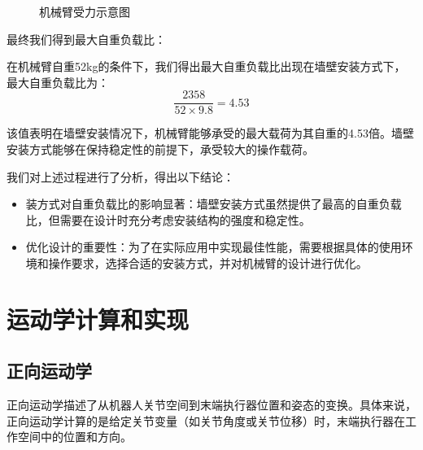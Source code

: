 \begin{figure}[htbp]
    \centering
    \caption{机械臂受力示意图}
\end{figure}

最终我们得到最大自重负载比：

在机械臂自重52kg的条件下，我们得出最大自重负载比出现在墙壁安装方式下，最大自重负载比为：
\begin{equation*}
    \frac{2358}{52 \times 9.8}=4.53
\end{equation*}

该值表明在墙壁安装情况下，机械臂能够承受的最大载荷为其自重的4.53倍。墙壁安装方式能够在保持稳定性的前提下，承受较大的操作载荷。

我们对上述过程进行了分析，得出以下结论：
\begin{itemize}
    \item 装方式对自重负载比的影响显著：墙壁安装方式虽然提供了最高的自重负载比，但需要在设计时充分考虑安装结构的强度和稳定性。
    \item 优化设计的重要性：为了在实际应用中实现最佳性能，需要根据具体的使用环境和操作要求，选择合适的安装方式，并对机械臂的设计进行优化。
\end{itemize}


\section{运动学计算和实现}
\subsection{正向运动学}
正向运动学描述了从机器人关节空间到末端执行器位置和姿态的变换。具体来说，正向运动学计算的是给定关节变量（如关节角度或关节位移）时，末端执行器在工作空间中的位置和方向。

